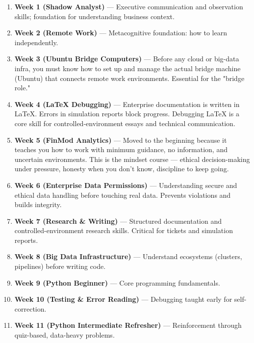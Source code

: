 \documentclass[12pt]{article}
\begin{document}
	\begin{enumerate}
		\item \textbf{Week 1 (Shadow Analyst)} — Executive communication and observation skills; foundation for understanding business context.
		
		\item \textbf{Week 2 (Remote Work)} — Metacognitive foundation: how to learn independently.
		
		\item \textbf{Week 3 (Ubuntu Bridge Computers)} — Before any cloud or big-data infra, you must know how to set up and manage the actual bridge machine (Ubuntu) that connects remote work environments. Essential for the "bridge role."
		
		\item \textbf{Week 4 (LaTeX Debugging)} — Enterprise documentation is written in LaTeX. Errors in simulation reports block progress. Debugging LaTeX is a core skill for controlled-environment essays and technical communication.
		
		\item \textbf{Week 5 (FinMod Analytics)} — Moved to the beginning because it teaches you how to work with minimum guidance, no information, and uncertain environments. This is the mindset course — ethical decision-making under pressure, honesty when you don't know, discipline to keep going.
		
		\item \textbf{Week 6 (Enterprise Data Permissions)} — Understanding secure and ethical data handling before touching real data. Prevents violations and builds integrity.
		
		\item \textbf{Week 7 (Research \& Writing)} — Structured documentation and controlled-environment research skills. Critical for tickets and simulation reports.
		
		\item \textbf{Week 8 (Big Data Infrastructure)} — Understand ecosystems (clusters, pipelines) before writing code.
		
		\item \textbf{Week 9 (Python Beginner)} — Core programming fundamentals.
		
		\item \textbf{Week 10 (Testing \& Error Reading)} — Debugging taught early for self-correction.
		
		\item \textbf{Week 11 (Python Intermediate Refresher)} — Reinforcement through quiz-based, data-heavy problems.
		

\end{enumerate}
\end{document}
